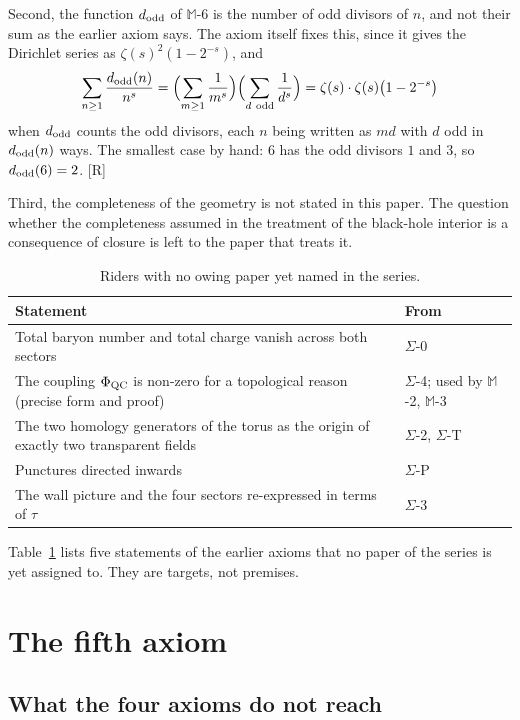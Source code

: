 \documentclass[11pt,a4paper]{article}
\theoremstyle{plain}
\theoremstyle{definition}
\theoremstyle{remark}
\newcommand{\rigR}{[\textup{R}]}
\newcommand{\Max}[1]{$\mathbb{M}$-#1}
\newcommand{\Sig}[1]{$\Sigma$-#1}
\begin{document}
Second, the function $d_{\mathrm{odd}}$ of \Max{6} is the number of odd divisors of $n$, and not their sum as the earlier axiom says. The axiom itself fixes this, since it gives the Dirichlet series as $\zeta(s)^{2}(1-2^{-s})$, and
\[
\sum_{n\ge1}\frac{\dodd(n)}{n^{s}}
=\Bigl(\sum_{m\ge1}\frac1{m^{s}}\Bigr)\Bigl(\sum_{d\ \mathrm{odd}}\frac1{d^{s}}\Bigr)
=\zeta(s)\cdot\zeta(s)\bigl(1-2^{-s}\bigr)
\]
when $d_{\mathrm{odd}}$ counts the odd divisors, each $n$ being written as $md$ with $d$ odd in $d_{\mathrm{odd}}(n)$ ways. The smallest case by hand: $6$ has the odd divisors $1$ and $3$, so $d_{\mathrm{odd}}(6)=2$. \rigR

Third, the completeness of the geometry is not stated in this paper. The question whether the completeness assumed in the treatment of the black-hole interior is a consequence of closure is left to the paper that treats it.

\begin{table}[t]
\begin{center}\small
\caption{Riders with no owing paper yet named in the series.}\label{tab:unowned}
\begin{tabular}{@{}p{}p{}@{}}
\toprule
Statement & From \\
\midrule
Total baryon number and total charge vanish across both sectors & \Sig{0} \\
The coupling $\Phi_{\mathrm{QC}}$ is non-zero for a topological reason (precise form and proof) & \Sig{4}; used by \Max{2}, \Max{3} \\
The two homology generators of the torus as the origin of exactly two transparent fields & \Sig{2}, \Sig{T} \\
Punctures directed inwards & \Sig{P} \\
The wall picture and the four sectors re-expressed in terms of $\tau$ & \Sig{3} \\
\bottomrule
\end{tabular}
\end{center}
\end{table}

Table~\ref{tab:unowned} lists five statements of the earlier axioms that no paper of the series is yet assigned to. They are targets, not premises.

\section{The fifth axiom}\label{sec:axiom}

\subsection{What the four axioms do not reach}\label{sec:reach}
\end{document}
